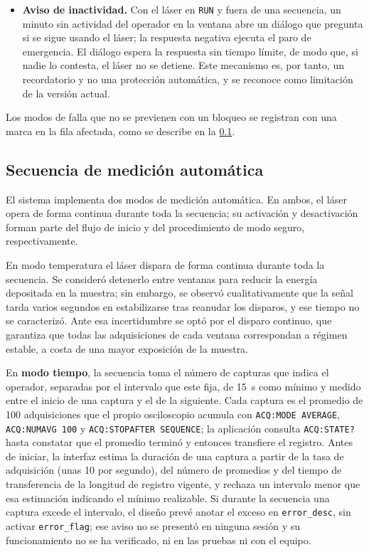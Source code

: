 \begin{itemize}
  \item \textbf{Aviso de inactividad.} Con el láser en \texttt{RUN} y
    fuera de una secuencia, un minuto sin actividad del operador en la
    ventana abre un diálogo que pregunta si se sigue usando el láser;
    la respuesta negativa ejecuta el paro de emergencia. El diálogo
    espera la respuesta sin tiempo límite, de modo que, si nadie lo
    contesta, el láser no se detiene. Este mecanismo es, por tanto, un
    recordatorio y no una protección automática, y se reconoce como
    limitación de la versión actual.
\end{itemize}

Los modos de falla que no se previenen con un bloqueo se registran
con una marca en la fila afectada, como se describe en la
\cref{sec:secuencia}.

\subsection{Secuencia de medición automática}
\label{sec:secuencia}

El sistema implementa dos modos de medición automática. En ambos, el
láser opera de forma continua durante toda la secuencia; su activación
y desactivación forman parte del flujo de inicio y del procedimiento de
modo seguro, respectivamente.

En modo temperatura el láser dispara de forma continua durante toda la
secuencia. Se consideró detenerlo entre ventanas para reducir la energía
depositada en la muestra; sin embargo, se observó cualitativamente que
la señal tarda varios segundos en estabilizarse tras reanudar los
disparos, y ese tiempo no se caracterizó. Ante esa incertidumbre se optó
por el disparo continuo, que garantiza que todas las adquisiciones de
cada ventana correspondan a régimen estable, a costa de una mayor
exposición de la muestra.

En \textbf{modo tiempo}, la secuencia toma el número de capturas que
indica el operador, separadas por el intervalo que este fija, de
\SI{15}{\second} como mínimo y medido entre el inicio de una captura y
el de la siguiente. Cada captura es el promedio de 100 adquisiciones
que el propio osciloscopio acumula con \texttt{ACQ:MODE AVERAGE},
\texttt{ACQ:NUMAVG 100} y \texttt{ACQ:STOPAFTER SEQUENCE}; la
aplicación consulta \texttt{ACQ:STATE?} hasta constatar que el
promedio terminó y entonces transfiere el registro. Antes de iniciar,
la interfaz estima la duración de una captura a partir de la tasa de
adquisición (unas 10 por segundo), del número de promedios y del tiempo
de transferencia de la longitud de registro vigente, y rechaza un
intervalo menor que esa estimación indicando el mínimo realizable. Si
durante la secuencia una captura excede el intervalo, el diseño prevé
anotar el exceso en \texttt{error\_desc}, sin activar
\texttt{error\_flag}; ese aviso no se presentó en ninguna sesión y su
funcionamiento no se ha verificado, ni en las pruebas ni con el
equipo.

